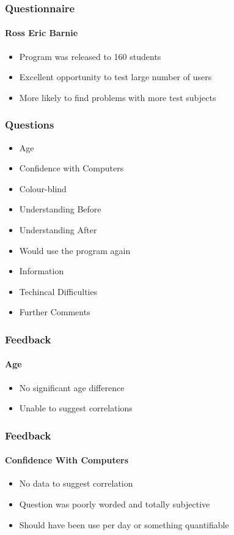 
\begin{frame}
  \frametitle{Questionnaire}
  \framesubtitle{Ross Eric Barnie}
  \begin{itemize}
  \item{Program was released to 160 students}
  \item{Excellent opportunity to test large number of users}
  \item{More likely to find problems with more test subjects}
  \end{itemize}
\end{frame}

\begin{frame}
  \frametitle{Questions}
  \begin{itemize}
    \item{Age}
    \item{Confidence with Computers}
    \item{Colour-blind}
    \item{Understanding Before}
    \item{Understanding After}
    \item{Would use the program again}
    \item{Information}
    \item{Techincal Difficulties}
    \item{Further Comments}
  \end{itemize}
\end{frame}

\begin{frame}
  \frametitle{Feedback}
  \framesubtitle{Age}
  \begin{itemize}
    \item{No significant age difference}
    \item{Unable to suggest correlations}
  \end{itemize}
\end{frame}

\begin{frame}
  \frametitle{Feedback}
  \framesubtitle{Confidence With Computers}
  \begin{itemize}
    \item{No data to suggest correlation}
    \item{Question was poorly worded and totally subjective}
    \item{Should have been use per day or something quantifiable}
  \end{itemize}
\end{frame}

